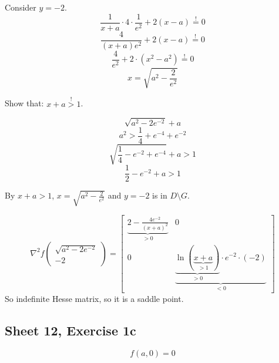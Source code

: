 \documentclass{article}
\begin{document}
Consider $y = -2$.
\[ \frac{1}{x + a} \cdot 4 \cdot \frac{1}{e^2} + 2 (x - a) \overset!= 0 \]
\[ \frac{4}{(x + a) e^2} + 2 (x - a) \overset!= 0 \]
\[ \frac{4}{e^2} + 2 \cdot (x^2 - a^2) \overset!= 0 \]
\[ x = \sqrt{a^2 - \frac{2}{e^2}} \]

Show that: $x + a \overset!> 1$.

\[ \sqrt{a^2 - 2e^{-2}} + a \]
\[ a^2 > \frac14 + e^{-4} + e^{-2} \]
\[ \sqrt{\frac14 - e^{-2} + e^{-4}} + a > 1 \]
\[ \frac12 - e^{-2} + a > 1 \]

By $x + a > 1$, $x = \sqrt{a^2  - \frac{2}{e^2}}$ and $y = -2$ is in $D \setminus G$.

\[
  \nabla^2 f \begin{pmatrix} \sqrt{a^2 - 2e^{-2}} \\ -2 \end{pmatrix}
  = \begin{bmatrix}
    \underbrace{2 - \frac{4e^{-2}}{(x + a)^2}}_{>0} & 0 \\
    0 & \underbrace{\underbrace{\ln(\underbrace{x + a}_{>1})}_{>0} \cdot e^{-2} \cdot (-2)}_{<0}
  \end{bmatrix}
\]
So indefinite Hesse matrix, so it is a saddle point.

\subsection{Sheet 12, Exercise 1c}
\[ f(a, 0) = 0 \]
\end{document}
